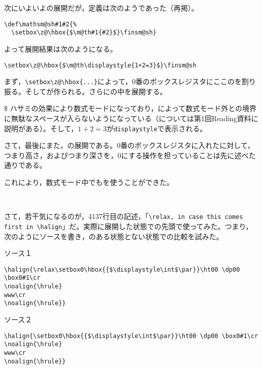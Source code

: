 \documentclass[autodetect-engine,dvipdfmx]{jsarticle}
\begin{document}
次にいよいよの展開だが，定義は次のようであった（再掲）。

\latexltx
\begin{lstlisting}[firstnumber=4145]
\def\mathsm@sh#1#2{%
  \setbox\z@\hbox{$\m@th#1{#2}$}\finsm@sh}
\end{lstlisting}

よって展開結果は次のようになる。

\texsource
\begin{lstlisting}
\setbox\z@\hbox{$\m@th\displaystyle{1+2=3}$}\finsm@sh
\end{lstlisting}

まず，\preSub\verb|\setbox\z@\hbox{...}|\preSub によって，0番のボックスレジスタにここのを割り振る。そしてが作られる。さらにの中を展開する。

\$ ハサミの効果により数式モードになっており，によって数式モード外との境界に無駄なスペースが入らないようになっている（については第1回Reading資料に説明がある）。そして，$1+2=3$が\texttt{displaystyle}で表示される。

さて，最後にまた，の展開である。0番のボックスレジスタに入れたに対して，つまり高さ，およびつまり深さを，0にする操作を担っていることは先に述べた通りである。

これにより，数式モード中でもを使うことができた。



\ 

さて，若干気になるのが，4137行目の記述，「\preSub\verb|\relax, in case this comes first in \halign|\preSub」だ。実際に展開した状態での先頭で使ってみた。つまり，次のようにソースを書き，のある状態とない状態での比較を試みた。

\noindent ソース１
\texsource
\begin{lstlisting}
\halign{\relax\setbox0\hbox{{$\displaystyle\int$\par}}\ht00 \dp00 \box0#1\cr
\noalign{\hrule}
www\cr
\noalign{\hrule}}
\end{lstlisting}

\noindent ソース２
\texsource
\begin{lstlisting}
\halign{\setbox0\hbox{{$\displaystyle\int$\par}}\ht00 \dp00 \box0#1\cr
\noalign{\hrule}
www\cr
\noalign{\hrule}}
\end{lstlisting}
\end{document}
